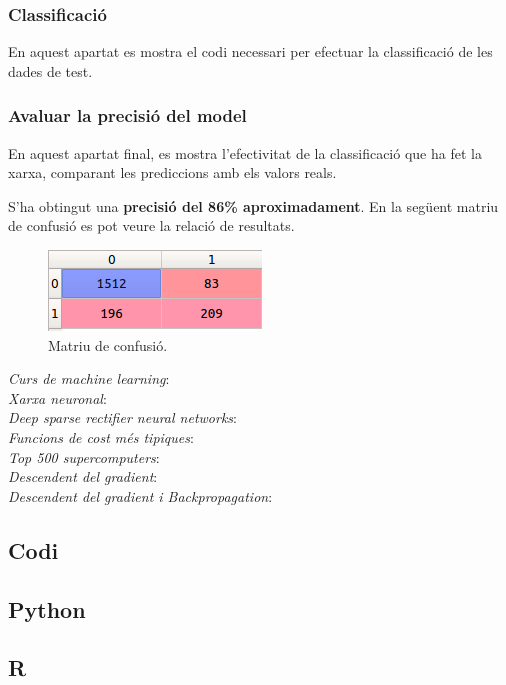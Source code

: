 \documentclass[12pt]{article}
\begin{document}
\subsubsection{Classificació}
En aquest apartat es mostra el codi necessari per efectuar la classificació de les dades de test.


\pagebreak
\subsubsection{Avaluar la precisió del model}
En aquest apartat final, es mostra l'efectivitat de la classificació que ha fet la xarxa, comparant les prediccions amb els valors reals.

S'ha obtingut una \textbf{precisió del 86\% aproximadament}. En la següent matriu de confusió es pot veure la relació de resultats.
\begin{figure}[h!]
	\centering
	\includegraphics[scale=0.7]{imatges/python/cm.png}
	\caption{Matriu de confusió.}
\end{figure}

\clearpage
\begin{thebibliography}{9}
	\textit{Curs de \textit{machine learning}}:
  	\\
	\textit{Xarxa neuronal}:
  	\\
	\textit{Deep sparse rectifier neural networks}:
  	\\
	\textit{Funcions de cost més tipiques}:
  	\\
	\textit{Top 500 supercomputers}:
  	\\
  	\textit{Descendent del gradient}:
  	\\
  	\textit{Descendent del gradient i Backpropagation}:
  	\\
\end{thebibliography}

\clearpage
\begin{appendices}
\section{Codi}
\subsection{Python\label{app:python}}

\clearpage
\subsection{R\label{app:r}}

\end{appendices}
\end{document}
